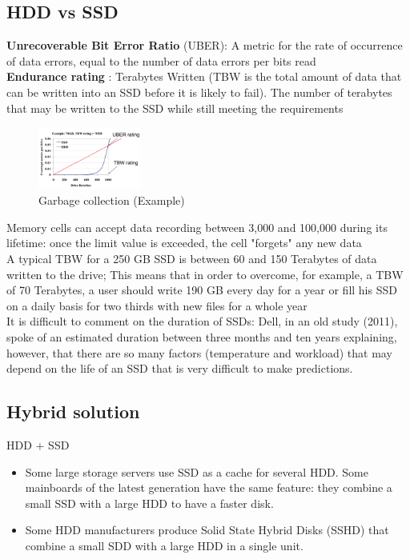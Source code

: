 \documentclass[10pt, oneside]{article}
\begin{document}
\subsection{HDD vs SSD}
\begin{multicols}{2}
{\bf Unrecoverable Bit Error Ratio} (UBER): A metric for the rate of occurrence of data errors, equal to the number of data errors per bits read\\ 
{\bf Endurance rating} : Terabytes Written (TBW is the total amount of data that can be written into an SSD before it is likely to fail). The number of terabytes that may be written to the SSD while still meeting the requirements\\
\columnbreak
\begin{figure}[H]
    \begin{center}
    \includegraphics[width=0.3\textwidth]{img/img18.png}
    \caption{Garbage collection (Example)}
    \label{fig:GC ex}
    \end{center}
\end{figure}
\end{multicols}
Memory cells can accept data recording between 3,000 and 100,000 during its lifetime: once the limit value is exceeded, the cell "forgets" any new data\\
\newline
A typical TBW for a 250 GB SSD is between 60 and 150 Terabytes of data written to the drive; This means that in order to overcome, for example, a TBW of 70 Terabytes, a user should write 190 GB every day for a year or fill his SSD on a daily basis for two thirds with new files for a whole year\\
\newline
It is difficult to comment on the duration of SSDs: Dell, in an old study (2011), spoke of an estimated duration between three months and ten years explaining, however, that there are so many factors (temperature and workload) that may depend on the life of an SSD that is very difficult to make predictions.

\subsection{Hybrid solution}
HDD + SSD
\begin{itemize}
    \item Some large storage servers use SSD as a cache for several HDD. Some mainboards of the latest generation have the same feature: they combine a small SSD with a large HDD to have a faster disk.
    \item Some HDD manufacturers produce Solid State Hybrid Disks (SSHD) that combine a small SDD with a large HDD in a single unit.
\end{itemize}
\end{document}
